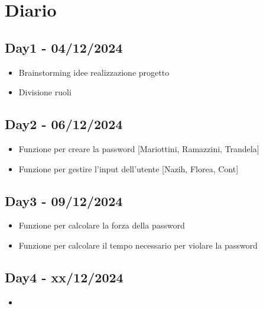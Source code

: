 \documentclass{scrartcl}
\begin{document}
    \section{Diario}

        \subsection{Day1 - 04/12/2024}
            \begin{itemize}
                \item Brainstorming idee realizzazione progetto
                \item Divisione ruoli
            \end{itemize}
        
        \subsection{Day2 - 06/12/2024}
            \begin{itemize}
                \item Funzione per creare la password [Mariottini, Ramazzini, Trandela]
                \item Funzione per gestire l'input dell'utente [Nazih, Florea, Cont]
            \end{itemize}
            
        \subsection{Day3 - 09/12/2024}
            \begin{itemize}
                \item Funzione per calcolare la forza della password
                \item Funzione per calcolare il tempo necessario per violare la password
            \end{itemize}

        \subsection{Day4 - xx/12/2024}
        \begin{itemize}
            \item 
        \end{itemize}
\end{document}
